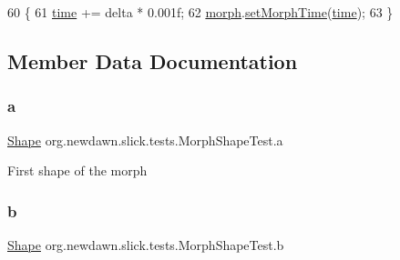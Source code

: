 \begin{DoxyCode}
60                                   \{
61         \mbox{\hyperlink{classorg_1_1newdawn_1_1slick_1_1tests_1_1_morph_shape_test_a8edc97f4a9122efd1e466e12f5c93ff8}{time}} += delta * 0.001f;
62         \mbox{\hyperlink{classorg_1_1newdawn_1_1slick_1_1tests_1_1_morph_shape_test_aa71e79154a050babecb8bdd71caeaedd}{morph}}.\mbox{\hyperlink{classorg_1_1newdawn_1_1slick_1_1geom_1_1_morph_shape_add1fba81944fe0dfd474ae7f5f808f64}{setMorphTime}}(\mbox{\hyperlink{classorg_1_1newdawn_1_1slick_1_1tests_1_1_morph_shape_test_a8edc97f4a9122efd1e466e12f5c93ff8}{time}});
63     \}
\end{DoxyCode}


\subsection{Member Data Documentation}
\mbox{\label{classorg_1_1newdawn_1_1slick_1_1tests_1_1_morph_shape_test_aae4a7aae8b258b98057d88786a82d46d}} 
\subsubsection{\texorpdfstring{a}{a}}
{\footnotesize\ttfamily \mbox{\hyperlink{classorg_1_1newdawn_1_1slick_1_1geom_1_1_shape}{Shape}} org.\+newdawn.\+slick.\+tests.\+Morph\+Shape\+Test.\+a\hspace{0.3cm}{\ttfamily [private]}}

First shape of the morph \mbox{\label{classorg_1_1newdawn_1_1slick_1_1tests_1_1_morph_shape_test_a8c12651e74bf24e1b5c00aa960c8f655}} 
\subsubsection{\texorpdfstring{b}{b}}
{\footnotesize\ttfamily \mbox{\hyperlink{classorg_1_1newdawn_1_1slick_1_1geom_1_1_shape}{Shape}} org.\+newdawn.\+slick.\+tests.\+Morph\+Shape\+Test.\+b\hspace{0.3cm}{\ttfamily [private]}}

